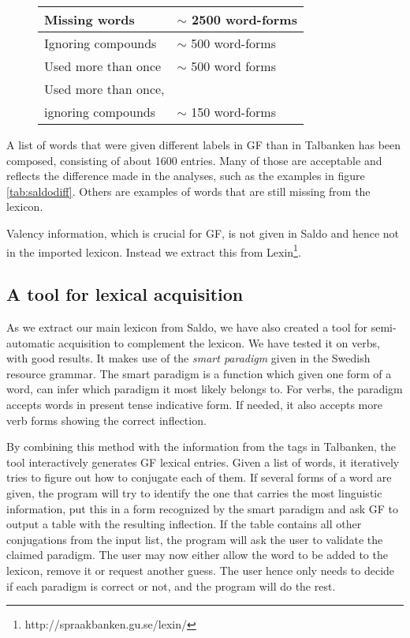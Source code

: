 \documentclass[10pt, a4paper]{article}
\begin{document}
\begin{figure}[h]
\begin{tabular}{|l|l|}
\hline
Missing words &$\sim$ 2500 word-forms\\
\hline
\hline
Ignoring compounds & $\sim$ 500 word-forms\\
Used more than once & $\sim$ 500 word forms\\
Used more than once,& \\
\hspace{2mm} ignoring compounds & $\sim$ 150 word-forms\\
\hline
\end{tabular}
\caption{}
\end{figure}

A list of words that were given different labels in GF than in Talbanken has been
composed, consisting of about 1600 entries. Many of those are
acceptable and reflects the difference 
made in the analyses, such as the examples in figure \ref{tab:saldodiff}.
Others are examples of words that are still missing from
the lexicon.

\noindent Valency information, which is crucial for GF, is not given in Saldo and
hence not in the imported lexicon. Instead we extract this from
Lexin\footnote{http://spraakbanken.gu.se/lexin/}.


\subsection{A tool for lexical acquisition}
As we extract our main lexicon from Saldo, we have also created a tool for
semi-automatic acquisition to complement the lexicon. We have
tested it on verbs, with good results. It makes use of
the \emph{smart paradigm} given in the Swedish resource grammar.
The smart paradigm is a function which given one form of a word, can
infer which paradigm it most likely belongs to.
For verbs, the paradigm accepts words in present tense indicative form.
If needed, it also accepts more verb forms showing the correct inflection.

By combining this method with the information from the tags in Talbanken,
the tool interactively generates GF lexical entries. 
Given a list of words, it iteratively
tries to figure out how to conjugate each of them. If several forms of a word are 
given, the program will try to identify the one that carries the most linguistic
information, put this in a form recognized by the smart paradigm and ask GF to output
a table with the resulting inflection. 
If the table contains all other conjugations from the input list,
the program will ask the  user to
validate the claimed paradigm. The user may now either
allow the word to be added to the lexicon, remove it or request another guess.
The user hence only needs to decide if each paradigm is correct or not, and
the program will do the rest.
\end{document}
